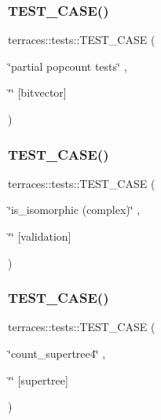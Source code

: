 \subsubsection{\texorpdfstring{T\+E\+S\+T\+\_\+\+C\+A\+S\+E()}{TEST\_CASE()}\hspace{0.1cm}{\footnotesize\ttfamily [29/78]}}
{\footnotesize\ttfamily terraces\+::tests\+::\+T\+E\+S\+T\+\_\+\+C\+A\+SE (\begin{DoxyParamCaption}\item[{\char`\"{}partial popcount tests\char`\"{}}]{,  }\item[{\char`\"{}\char`\"{}}]{\mbox{[}bitvector\mbox{]} }\end{DoxyParamCaption})}

\mbox{\label{namespaceterraces_1_1tests_aeae228e072ad382f6df26d0551bafe00}} 
\subsubsection{\texorpdfstring{T\+E\+S\+T\+\_\+\+C\+A\+S\+E()}{TEST\_CASE()}\hspace{0.1cm}{\footnotesize\ttfamily [30/78]}}
{\footnotesize\ttfamily terraces\+::tests\+::\+T\+E\+S\+T\+\_\+\+C\+A\+SE (\begin{DoxyParamCaption}\item[{\char`\"{}is\+\_\+isomorphic (complex)\char`\"{}}]{,  }\item[{\char`\"{}\char`\"{}}]{\mbox{[}validation\mbox{]} }\end{DoxyParamCaption})}

\mbox{\label{namespaceterraces_1_1tests_ae2254265c9a29c1103697d80a885a0e6}} 
\subsubsection{\texorpdfstring{T\+E\+S\+T\+\_\+\+C\+A\+S\+E()}{TEST\_CASE()}\hspace{0.1cm}{\footnotesize\ttfamily [31/78]}}
{\footnotesize\ttfamily terraces\+::tests\+::\+T\+E\+S\+T\+\_\+\+C\+A\+SE (\begin{DoxyParamCaption}\item[{\char`\"{}count\+\_\+supertree4\char`\"{}}]{,  }\item[{\char`\"{}\char`\"{}}]{\mbox{[}supertree\mbox{]} }\end{DoxyParamCaption})}

